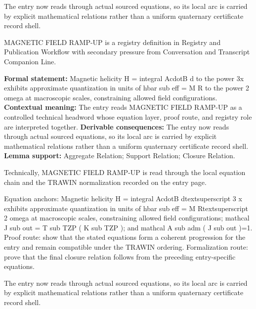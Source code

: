 The entry now reads through actual sourced equations, so its local arc is carried by explicit mathematical relations rather than a uniform quaternary certificate record shell.
\clearpage


\begingroup\small
{}
MAGNETIC FIELD RAMP-UP is a registry definition in Registry and Publication Workflow with secondary pressure from Conversation and Transcript Companion Line.

\begingroup\footnotesize\setlength{\emergencystretch}{3em}\sloppy
\textbf{Formal statement:} Magnetic helicity H = integral AcdotB d to the power 3x exhibits approximate quantization in units of hbar sub eff = M R to the power 2 omega at macroscopic scales, constraining allowed field configurations. \textbf{Contextual meaning:} The entry reads MAGNETIC FIELD RAMP-UP as a controlled technical headword whose equation layer, proof route, and registry role are interpreted together. \textbf{Derivable consequences:} The entry now reads through actual sourced equations, so its local arc is carried by explicit mathematical relations rather than a uniform quaternary certificate record shell. \textbf{Lemma support:} Aggregate Relation; Support Relation; Closure Relation.\par
\endgroup

Technically, MAGNETIC FIELD RAMP-UP is read through the local equation chain and the TRAWIN normalization recorded on the entry page.

Equation anchors: Magnetic helicity H = integral AcdotB dtextsuperscript 3 x exhibits approximate quantization in units of hbar sub eff = M Rtextsuperscript 2 omega at macroscopic scales, constraining allowed field configurations; mathcal J sub out = T sub TZP ( K sub TZP ); and mathcal A sub adm ( J sub out )=1. Proof route: show that the stated equations form a coherent progression for the entry and remain compatible under the TRAWIN ordering. Formalization route: prove that the final closure relation follows from the preceding entry-specific equations.

The entry now reads through actual sourced equations, so its local arc is carried by explicit mathematical relations rather than a uniform quaternary certificate record shell.
\endgroup

